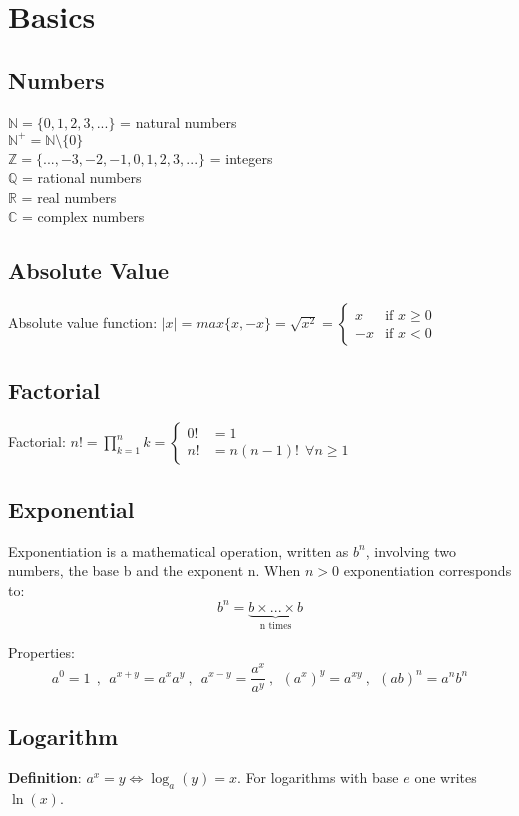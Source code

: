 \chapter{Basics}

\section{Numbers}

$\mathbb{N} = \{0,1,2,3,...\} $ = natural numbers \\
$\mathbb{N^+} = \mathbb{N}\setminus\{0\}$ \\
$\mathbb{Z} = \{...,-3,-2,-1,0,1,2,3,...\} $ = integers \\
$\mathbb{Q}$ = rational numbers \\
$\mathbb{R}$ = real numbers \\
$\mathbb{C}$ = complex numbers

\section{Absolute Value}

Absolute value function: $ \left|x\right| = max\{x,-x\} = \sqrt{x^2} = \begin{cases}
x & \text{if } x\geq0\\
-x & \text{if } x<0
\end{cases} $

\section{Factorial}

Factorial: $ n! = \prod_{k=1}^{n}k  = \begin{cases}
0! &= 1\\
n! &= n(n-1)! \ \ \forall n\ge1
\end{cases} $

\section{Exponential}
Exponentiation is a mathematical operation, written as $b^n$, involving two numbers, the base b and the exponent n. When $n>0$ exponentiation corresponds to: $$b^n=\underbrace{b \times ... \times b}_\text{n times}$$

Properties:
\[
a^0=1 \ \ , \ \ a^{x+y}=a^xa^y \ , \ \ a^{x-y}=\frac{a^x}{a^y} \ , \ \ (a^x)^y=a^{xy} \ , \ \ (ab)^n = a^nb^n
\]

\section{Logarithm}
{\bf Definition}: $a^x=y\Leftrightarrow\log_a(y)=x $. For logarithms with
base $e$ one writes $\ln(x)$.

